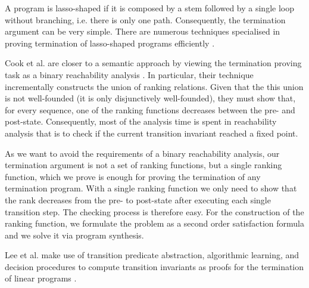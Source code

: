 \documentclass[preprint]{sigplanconf}
\theoremstyle{definition}
\begin{document}
A program is lasso-shaped if it is composed by a stem followed by a single loop without branching, i.e. there is only one path. 
Consequently, the termination argument can be very simple. There are numerous techniques specialised in
proving termination of lasso-shaped programs efficiently \cite{DBLP:conf/popl/Ben-AmramG13,DBLP:conf/cav/BradleyMS05,DBLP:conf/atva/HeizmannHLP13,DBLP:conf/vmcai/P04}. 

Cook et al. are closer to a semantic approach by viewing the termination proving task as a binary reachability analysis \cite{DBLP:conf/pldi/CookPR06}.
In particular, their technique incrementally constructs the union of ranking relations.
Given that the this union is not well-founded (it is only disjunctively well-founded),
they must show that, for every sequence, one of the ranking functions decreases
between the pre- and post-state. %
Consequently, most of the analysis time is spent in reachability analysis that is to check if the current
transition invariant reached a fixed point.

As we want to avoid the requirements of a binary reachability analysis, our termination argument is not a set
of ranking functions, but a single ranking function, which we prove is enough for proving the termination of any termination program. 
With a single ranking function we only need to show that the rank decreases from the
pre- to post-state after executing each single transition step.
The checking process is therefore easy. For the construction of the ranking function, we 
formulate the problem as a second order satisfaction formula and we solve it via program synthesis.

Lee et al. make use of transition predicate abstraction, algorithmic learning, and decision procedures to compute transition
invariants as proofs for the termination of linear programs \cite{DBLP:conf/cav/LeeWY12}.
\end{document}
